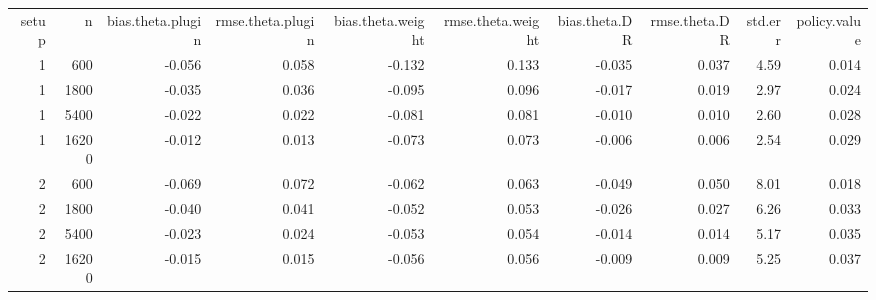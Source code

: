 \begin{table}[ht]
\centering
\begin{tabular}{rrrrrrrrrr}
 setup & n & bias.theta.plugin & rmse.theta.plugin & bias.theta.weight & rmse.theta.weight & bias.theta.DR & rmse.theta.DR & std.err & policy.value \\ 
 1 & 600 & -0.056 & 0.058 & -0.132 & 0.133 & -0.035 & 0.037 & 4.59 & 0.014 \\ 
  1 & 1800 & -0.035 & 0.036 & -0.095 & 0.096 & -0.017 & 0.019 & 2.97 & 0.024 \\ 
  1 & 5400 & -0.022 & 0.022 & -0.081 & 0.081 & -0.010 & 0.010 & 2.60 & 0.028 \\ 
  1 & 16200 & -0.012 & 0.013 & -0.073 & 0.073 & -0.006 & 0.006 & 2.54 & 0.029 \\ 
   \hline
2 & 600 & -0.069 & 0.072 & -0.062 & 0.063 & -0.049 & 0.050 & 8.01 & 0.018 \\ 
  2 & 1800 & -0.040 & 0.041 & -0.052 & 0.053 & -0.026 & 0.027 & 6.26 & 0.033 \\ 
  2 & 5400 & -0.023 & 0.024 & -0.053 & 0.054 & -0.014 & 0.014 & 5.17 & 0.035 \\ 
  2 & 16200 & -0.015 & 0.015 & -0.056 & 0.056 & -0.009 & 0.009 & 5.25 & 0.037 \\ 
   \hline
\end{tabular}
\end{table}

